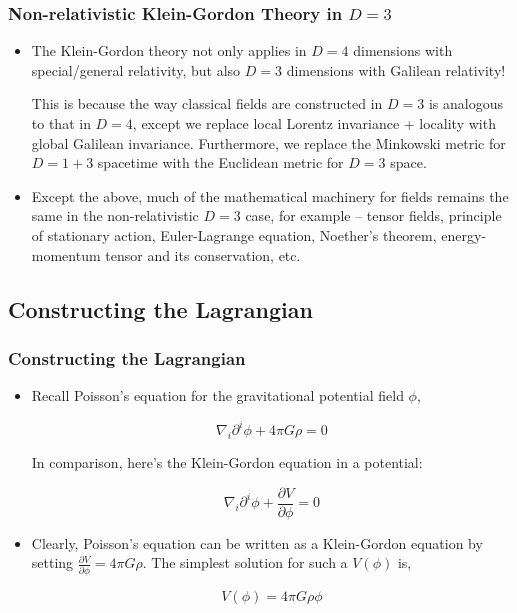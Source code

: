\documentclass{beamer}
\begin{document}
\begin{frame}
\frametitle{Non-relativistic Klein-Gordon Theory in $D=3$}

\begin{itemize}
\item The Klein-Gordon theory not only applies in $D=4$ dimensions with special/general relativity, but also $D=3$ dimensions with Galilean relativity! 

This is because the way classical fields are constructed in $D=3$ is analogous to that in $D=4$, except we replace local Lorentz invariance + locality with global Galilean invariance. Furthermore, we replace the Minkowski metric for $D=1+3$ spacetime with the Euclidean metric for $D=3$ space.

\item Except the above, much of the mathematical machinery for fields remains the same in the non-relativistic $D=3$ case, for example -- tensor fields, principle of stationary action, Euler-Lagrange equation, Noether's theorem, energy-momentum tensor and its conservation, etc. 
\end{itemize}
\end{frame}

\subsection{Constructing the Lagrangian}

\begin{frame}
\frametitle{Constructing the Lagrangian}

\begin{itemize}
\item Recall Poisson's equation for the gravitational potential field $\phi$,

$$\nabla_i \partial^i \phi + 4 \pi G \rho = 0$$

In comparison, here's the Klein-Gordon equation in a potential:

$$\nabla_i \partial^i \phi + \frac{\partial V}{\partial \phi} = 0$$

\item Clearly, Poisson's equation can be written as a Klein-Gordon equation by setting $\displaystyle{\frac{\partial V}{\partial \phi} = 4 \pi G \rho}$. The simplest solution for such a $V \left( \phi \right)$ is,

$$V \left( \phi \right) = 4 \pi G \rho \phi$$
\end{itemize}
\end{frame}
\end{document}
